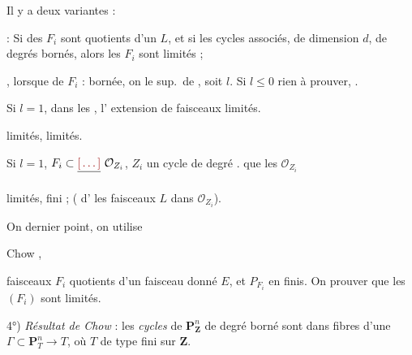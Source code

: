 \documentclass[11pt,a4paper]{article}
\begin{document}
Il y a deux variantes : \ill{}

\emph{} : Si des $F_i$ sont quotients d'un
\ill{} $L$, et si les cycles associés, de dimension $d$, \ill{} de
degrés bornés, alors les $F_i$ sont limités ;


 , lorsque \ill{} \ill{} de
$F_i$  : \ill{} bornée, on \ill{}
\ill{} \ill{} le sup.\ de \struck{\ill{}} \add{\ill{}} ,
soit $l$. Si $l \le 0$ rien à prouver, \ill{} \ill{} 
.

 Si $l = 1$, dans les \ill{} \ill{},
\ill{}  \ill{} l'\ill{} \ill{} extension de faisceaux
\ill{} \ill{} limités.

 limités,  limités.

Si $l = 1$, $F_i \subset \struck{\ill{}}\ \mathcal{O}_{Z_i}$, $Z_i$ un
cycle \struck{\ill{}}  de degré \struck{\ill{}}
. \ill{}
 \ill{} \ill{} \ill{} que les $\mathcal{O}_{Z_i}$

  limités, \ill{} \ill{} fini ; (\ill{}
\ill{} d'\ill{} \ill{} les faisceaux $L$ dans $\mathcal{O}_{Z_i}$).

On \ill{} \ill{} dernier point, on utilise

 Chow ,

faisceaux $F_i$ quotients d'un faisceau donné $E$, et \struck{\ill{}}
 $P_{F_i}$ en \struck{\ill{}}  finis. On
 prouver que les $(F_i)$ sont limités.

\struck{\ill{}}
4°) \emph{Résultat de Chow} : les \emph{cycles} de $\mathbf{P}^n_{\mathbf{Z}}$
de  degré \struck{\ill{}} borné sont 
dans  fibres d'une  
\ill{} \struck{\ill{}} $\Gamma \subset \mathbf{P}^n_T \to T$, où $T$ de type
fini sur $\mathbf{Z}$.
\end{document}
